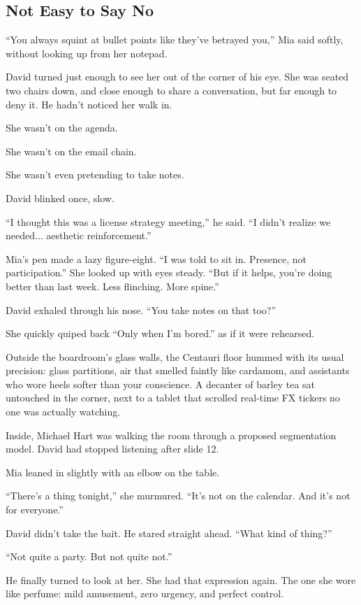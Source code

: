 \subsection{Not Easy to Say No}

``You always squint at bullet points like they’ve betrayed you,'' Mia said softly, without looking up from her notepad.

David turned just enough to see her out of the corner of his eye. She was seated two chairs down, and close 
enough to share a conversation, but far enough to deny it. He hadn’t noticed her walk in.

She wasn’t on the agenda.

She wasn’t on the email chain.

She wasn’t even pretending to take notes.

David blinked once, slow.

``I thought this was a license strategy meeting,'' he said. ``I didn’t realize we needed... aesthetic reinforcement.''

Mia’s pen made a lazy figure-eight. ``I was told to sit in. Presence, not participation.'' She looked up  
with eyes steady. ``But if it helps, you’re doing better than last week. Less flinching. More spine.''

David exhaled through his nose. ``You take notes on that too?''

She quickly quiped back ``Only when I’m bored.'' as if it were rehearsed.

Outside the boardroom’s glass walls, the Centauri floor hummed with its usual precision: glass partitions, air 
that smelled faintly like cardamom, and assistants who wore heels softer than your conscience. A decanter of barley 
tea sat untouched in the corner, next to a tablet that scrolled real-time FX tickers no one was actually watching.

Inside, Michael Hart was walking the room through a proposed segmentation model. David had stopped listening 
after slide 12.

Mia leaned in slightly with an elbow on the table.

``There’s a thing tonight,'' she murmured. ``It's not on the calendar. And it's not for everyone.''

David didn’t take the bait. He stared straight ahead. ``What kind of thing?''

``Not quite a party. But not quite not.''

He finally turned to look at her. She had that expression again. The one she wore like perfume: mild amusement, 
zero urgency, and perfect control.

